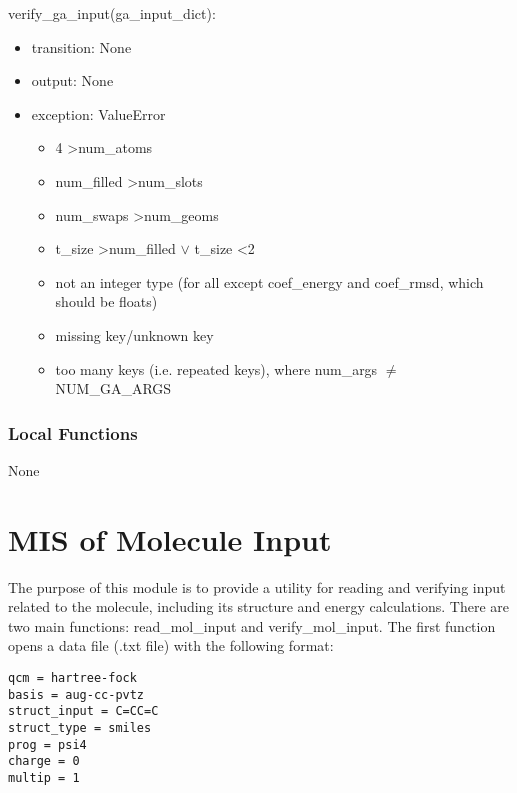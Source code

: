 \documentclass[12pt, titlepage]{article}
\begin{document}
\noindent verify\_ga\_input(ga\_input\_dict):
\begin{itemize}
	\item transition: None
	\item output: None
	\item exception: ValueError
	\begin{itemize}
		\item 4 \textgreater num\_atoms
		\item num\_filled \textgreater num\_slots
		\item num\_swaps \textgreater num\_geoms
		\item t\_size \textgreater num\_filled $\lor$ t\_size \textless 2
		\item not an integer type (for all except coef\_energy and coef\_rmsd, 
		which should be floats)
		\item missing key/unknown key
		\item too many keys (i.e. repeated keys), where num\_args $\neq$ 
		NUM\_GA\_ARGS 
	\end{itemize}
\end{itemize}

\subsubsection{Local Functions}

None


\section{MIS of Molecule Input} \label{section-mol_input}

The purpose of this module is to provide a utility for reading and verifying 
input related to the molecule, including its structure and energy calculations. 
There are two main functions: read\_mol\_input and verify\_mol\_input. The 
first function opens a data file (.txt file) with the following format:

\begin{lstlisting}
qcm = hartree-fock
basis = aug-cc-pvtz
struct_input = C=CC=C
struct_type = smiles
prog = psi4
charge = 0
multip = 1
\end{lstlisting}
\end{document}
